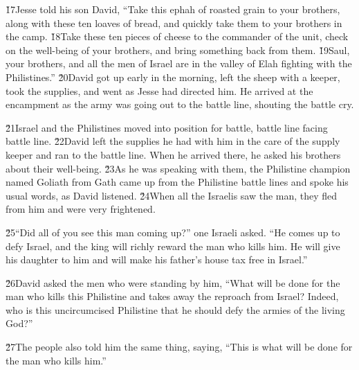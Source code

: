 \v{17}Jesse told his son David, ``Take this ephah of roasted grain to your brothers, along with these ten loaves of bread, and quickly take them to your brothers in the camp. \v{18}Take these ten pieces of cheese to the commander of the unit, check on the well-being of your brothers, and bring something back from them. \v{19}Saul, your brothers, and all the men of Israel are in the valley of Elah fighting with the Philistines.'' \v{20}David got up early in the morning, left the sheep with a keeper, took the supplies, and went as Jesse had directed him. He arrived at the encampment as the army was going out to the battle line, shouting the battle cry.

\v{21}Israel and the Philistines moved into position for battle, battle line facing battle line. \v{22}David left the supplies he had with him in the care of the supply keeper and ran to the battle line. When he arrived there, he asked his brothers about their well-being. \v{23}As he was speaking with them, the Philistine champion named Goliath from Gath came up from the Philistine battle lines and spoke his usual words, as David listened. \v{24}When all the Israelis saw the man, they fled from him and were very frightened.

\v{25}``Did all of you see this man coming up?'' one Israeli asked. ``He comes up to defy Israel, and the king will richly reward the man who kills him. He will give his daughter to him and will make his father's house tax free in Israel.''

\v{26}David asked the men who were standing by him, ``What will be done for the man who kills this Philistine and takes away the reproach from Israel? Indeed, who is this uncircumcised Philistine that he should defy the armies of the living God?''

\v{27}The people also told him the same thing, saying, ``This is what will be done for the man who kills him.''

